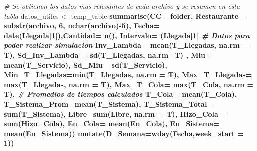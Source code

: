 \documentclass[]{article}
\newenvironment{Shaded}{\begin{snugshade}}{\end{snugshade}}
\newcommand{\CommentTok}[1]{\textcolor[rgb]{0.56,0.35,0.01}{\textit{#1}}}
\newcommand{\DataTypeTok}[1]{\textcolor[rgb]{0.13,0.29,0.53}{#1}}
\newcommand{\DecValTok}[1]{\textcolor[rgb]{0.00,0.00,0.81}{#1}}
\newcommand{\KeywordTok}[1]{\textcolor[rgb]{0.13,0.29,0.53}{\textbf{#1}}}
\newcommand{\NormalTok}[1]{#1}
\newcommand{\OperatorTok}[1]{\textcolor[rgb]{0.81,0.36,0.00}{\textbf{#1}}}
\newcommand{\StringTok}[1]{\textcolor[rgb]{0.31,0.60,0.02}{#1}}
\begin{document}
\begin{Shaded}
\begin{Highlighting}[]
{{      
      \CommentTok{# Se obtienen los datos mas relevantes de cada archivo y se resumen en esta tabla}
\NormalTok{      datos_utiles <-}\StringTok{ }\NormalTok{temp_table  }\OperatorTok{%>%}\StringTok{ }
\StringTok{        }\KeywordTok{summarise}\NormalTok{(}\DataTypeTok{CC=}\NormalTok{ folder, }\DataTypeTok{Restaurante=} \KeywordTok{substr}\NormalTok{(archivo, }\DecValTok{6}\NormalTok{, }\KeywordTok{nchar}\NormalTok{(archivo)}\OperatorTok{-}\DecValTok{5}\NormalTok{), }\DataTypeTok{Fecha=} \KeywordTok{date}\NormalTok{(Llegada[}\DecValTok{1}\NormalTok{]),}\DataTypeTok{Cantidad=} \KeywordTok{n}\NormalTok{(),}
                  \DataTypeTok{Intervalo=}\NormalTok{ (Llegada[}\DecValTok{1}\NormalTok{]}\OperatorTok{%--%}\NormalTok{Llegada[}\KeywordTok{nrow}\NormalTok{(temp_table)]), }\DataTypeTok{Intervalo2=}\NormalTok{ (Llegada[}\DecValTok{1}\NormalTok{]}\OperatorTok{%--%}\NormalTok{Final[}\KeywordTok{nrow}\NormalTok{(temp_table)]),}
                  \CommentTok{# Datos para poder realizar simulacion}
                  \DataTypeTok{Inv_Lambda=} \KeywordTok{mean}\NormalTok{(T_Llegadas, }\DataTypeTok{na.rm =}\NormalTok{ T), }\DataTypeTok{Sd_Inv_Lambda =} \KeywordTok{sd}\NormalTok{(T_Llegadas, }\DataTypeTok{na.rm=}\NormalTok{T) , }\DataTypeTok{Miu=} \KeywordTok{mean}\NormalTok{(T_Servicio), }\DataTypeTok{Sd_Miu=} \KeywordTok{sd}\NormalTok{(T_Servicio),}
                  \DataTypeTok{Min_T_Llegadas=}\KeywordTok{min}\NormalTok{(T_Llegadas, }\DataTypeTok{na.rm =}\NormalTok{ T), }\DataTypeTok{Max_T_Llegadas=} \KeywordTok{max}\NormalTok{(T_Llegadas, }\DataTypeTok{na.rm =}\NormalTok{ T), }\DataTypeTok{Max_T_Cola=} \KeywordTok{max}\NormalTok{(T_Cola, }\DataTypeTok{na.rm =}\NormalTok{ T),}
                  \CommentTok{# Promedios de tiempos calculados}
                  \DataTypeTok{T_Cola=} \KeywordTok{mean}\NormalTok{(T_Cola), }\DataTypeTok{T_Sistema_Prom=}\KeywordTok{mean}\NormalTok{(T_Sistema),}
                  \DataTypeTok{T_Sistema_Total=} \KeywordTok{sum}\NormalTok{(T_Sistema), }\DataTypeTok{Libre=}\KeywordTok{sum}\NormalTok{(Libre, }\DataTypeTok{na.rm =}\NormalTok{ T), }\DataTypeTok{Hizo_Cola=} \KeywordTok{sum}\NormalTok{(Hizo_Cola),}
                  \DataTypeTok{En_Cola=} \KeywordTok{mean}\NormalTok{(En_Cola), }\DataTypeTok{En_Sistema=} \KeywordTok{mean}\NormalTok{(En_Sistema)) }\OperatorTok{%>%}\StringTok{ }
\StringTok{        }\KeywordTok{mutate}\NormalTok{(}\DataTypeTok{D_Semana=}\KeywordTok{wday}\NormalTok{(Fecha,}\DataTypeTok{week_start =} \DecValTok{1}\NormalTok{)) }\OperatorTok{%>%}\StringTok{ }\KeywordTok{mutate}\NormalTok{(}\DataTypeTok{FinDe =} \KeywordTok{ifelse}\NormalTok{(D_Semana}\OperatorTok{>=}\DecValTok{6}\NormalTok{,}\DecValTok{1}\NormalTok{,}\DecValTok{0}\NormalTok{)) }\OperatorTok{%>%}\StringTok{ }
}}}}}}
\end{Highlighting}
\end{Shaded}
\end{document}
